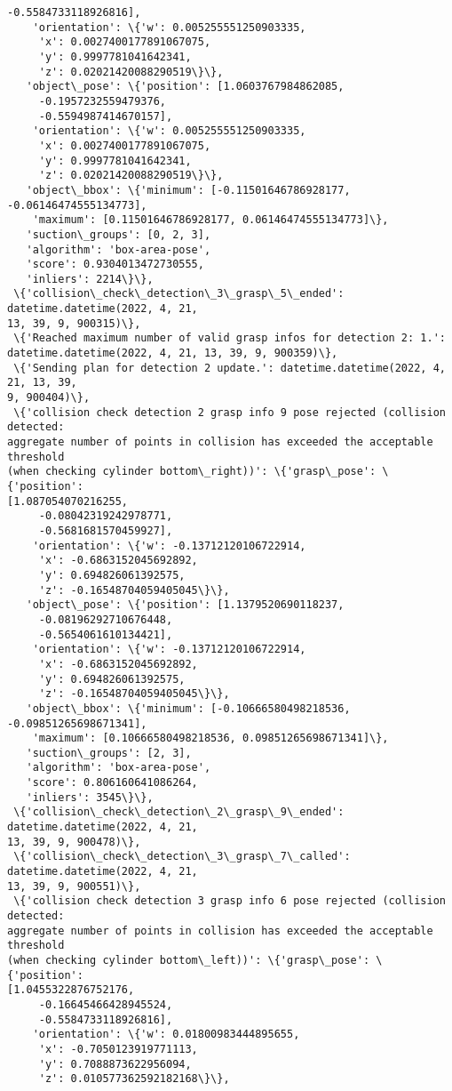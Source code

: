 \documentclass[11pt]{article}
\begin{document}
\begin{tcolorbox}[breakable, size=fbox, boxrule=.5pt, pad at break*=1mm, opacityfill=0]
\begin{Verbatim}[commandchars=\\\{\}]
     -0.5584733118926816],
    'orientation': \{'w': 0.005255551250903335,
     'x': 0.0027400177891067075,
     'y': 0.9997781041642341,
     'z': 0.02021420088290519\}\},
   'object\_pose': \{'position': [1.0603767984862085,
     -0.1957232559479376,
     -0.5594987414670157],
    'orientation': \{'w': 0.005255551250903335,
     'x': 0.0027400177891067075,
     'y': 0.9997781041642341,
     'z': 0.02021420088290519\}\},
   'object\_bbox': \{'minimum': [-0.11501646786928177, -0.06146474555134773],
    'maximum': [0.11501646786928177, 0.06146474555134773]\},
   'suction\_groups': [0, 2, 3],
   'algorithm': 'box-area-pose',
   'score': 0.9304013472730555,
   'inliers': 2214\}\},
 \{'collision\_check\_detection\_3\_grasp\_5\_ended': datetime.datetime(2022, 4, 21,
13, 39, 9, 900315)\},
 \{'Reached maximum number of valid grasp infos for detection 2: 1.':
datetime.datetime(2022, 4, 21, 13, 39, 9, 900359)\},
 \{'Sending plan for detection 2 update.': datetime.datetime(2022, 4, 21, 13, 39,
9, 900404)\},
 \{'collision check detection 2 grasp info 9 pose rejected (collision detected:
aggregate number of points in collision has exceeded the acceptable threshold
(when checking cylinder bottom\_right))': \{'grasp\_pose': \{'position':
[1.087054070216255,
     -0.08042319242978771,
     -0.5681681570459927],
    'orientation': \{'w': -0.13712120106722914,
     'x': -0.6863152045692892,
     'y': 0.694826061392575,
     'z': -0.16548704059405045\}\},
   'object\_pose': \{'position': [1.1379520690118237,
     -0.08196292710676448,
     -0.5654061610134421],
    'orientation': \{'w': -0.13712120106722914,
     'x': -0.6863152045692892,
     'y': 0.694826061392575,
     'z': -0.16548704059405045\}\},
   'object\_bbox': \{'minimum': [-0.10666580498218536, -0.09851265698671341],
    'maximum': [0.10666580498218536, 0.09851265698671341]\},
   'suction\_groups': [2, 3],
   'algorithm': 'box-area-pose',
   'score': 0.806160641086264,
   'inliers': 3545\}\},
 \{'collision\_check\_detection\_2\_grasp\_9\_ended': datetime.datetime(2022, 4, 21,
13, 39, 9, 900478)\},
 \{'collision\_check\_detection\_3\_grasp\_7\_called': datetime.datetime(2022, 4, 21,
13, 39, 9, 900551)\},
 \{'collision check detection 3 grasp info 6 pose rejected (collision detected:
aggregate number of points in collision has exceeded the acceptable threshold
(when checking cylinder bottom\_left))': \{'grasp\_pose': \{'position':
[1.0455322876752176,
     -0.16645466428945524,
     -0.5584733118926816],
    'orientation': \{'w': 0.01800983444895655,
     'x': -0.7050123919771113,
     'y': 0.7088873622956094,
     'z': 0.010577362592182168\}\},

\end{Verbatim}
\end{tcolorbox}
\end{document}
